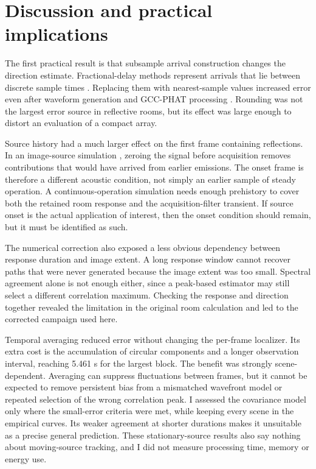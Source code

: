 \documentclass{edpsci}
\begin{document}
\section{Discussion and practical implications}

The first practical result is that subsample arrival construction changes the direction estimate. Fractional-delay methods represent arrivals that lie between discrete sample times \citep{laakso}. Replacing them with nearest-sample values increased error even after waveform generation and GCC-PHAT processing \citep{knapp}. Rounding was not the largest error source in reflective rooms, but its effect was large enough to distort an evaluation of a compact array.

Source history had a much larger effect on the first frame containing reflections. In an image-source simulation \citep{allen}, zeroing the signal before acquisition removes contributions that would have arrived from earlier emissions. The onset frame is therefore a different acoustic condition, not simply an earlier sample of steady operation. A continuous-operation simulation needs enough prehistory to cover both the retained room response and the acquisition-filter transient. If source onset is the actual application of interest, then the onset condition should remain, but it must be identified as such.

The numerical correction also exposed a less obvious dependency between response duration and image extent. A long response window cannot recover paths that were never generated because the image extent was too small. Spectral agreement alone is not enough either, since a peak-based estimator may still select a different correlation maximum. Checking the response and direction together revealed the limitation in the original room calculation and led to the corrected campaign used here.

Temporal averaging reduced error without changing the per-frame localizer. Its extra cost is the accumulation of circular components and a longer observation interval, reaching 5.461 s for the largest block. The benefit was strongly scene-dependent. Averaging can suppress fluctuations between frames, but it cannot be expected to remove persistent bias from a mismatched wavefront model or repeated selection of the wrong correlation peak. I assessed the covariance model only where the small-error criteria were met, while keeping every scene in the empirical curves. Its weaker agreement at shorter durations makes it unsuitable as a precise general prediction. These stationary-source results also say nothing about moving-source tracking, and I did not measure processing time, memory or energy use.
\end{document}
